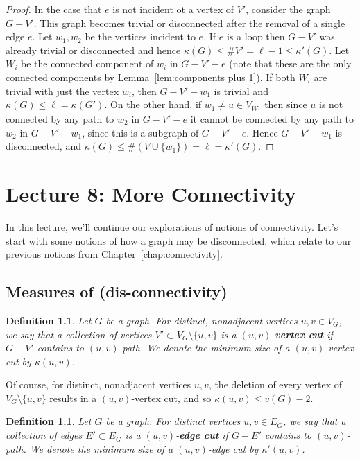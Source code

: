 \documentclass[12pt]{report}
\theoremstyle{plain}
\newtheorem{defn}[thm]{Definition}
\newcommand{\Xb}[1]{\textbf{#1}\index{#1}}
\begin{document}
\begin{proof}
In the case that $e$ is not incident ot a vertex of $V'$, consider the
graph $G - V'$. This graph becomes trivial or disconnected after the
removal of a single edge $e$. Let $w_1, w_2$ be the vertices incident to $e$.
If $e$ is a loop then $G - V'$ was already trivial or disconnected and
hence $\kappa(G) \leq \#V' = \ell - 1 \leq \kappa'(G)$. Let $W_i$ be the
connected component of $w_i$ in $G - V' - e$ (note that these are the only
connected components by Lemma~\ref{lem:components plus 1}). If both $W_i$
are trivial with just the vertex $w_i$, then $G - V' - w_1$ is trivial
and $\kappa(G) \leq \ell = \kappa(G')$. On the other hand, if $w_1 \neq u
\in V_{W_1}$ then since $u$ is not connected by any path to $w_2$ in $G -
V' - e$ it cannot be connected by any path to $w_2$ in $G - V' - w_1$,
since this is a subgraph of $G - V' - e$. Hence $G - V' - w_1$ is
disconnected, and $\kappa(G) \leq \#(V \cup \{w_1\}) = \ell = \kappa'(G)$.
\end{proof}

\chapter{Lecture 8: More Connectivity} \label{chap:more connectivity}

In this lecture, we'll continue our explorations of notions of
connectivity. Let's start with some notions of how a graph may be
disconnected, which relate to our previous notions from
Chapter~\ref{chap:connectivity}.

\section{Measures of (dis-connectivity)}

\begin{defn}
Let $G$ be a graph. For distinct, nonadjacent vertices $u, v \in V_G$, we
say that a collection of vertices $V' \subset V_G \setminus \{u, v\}$ is a
$(u,v)$-\Xb{vertex cut} if $G - V'$ contains to $(u, v)$-path. We denote
the minimum size of a $(u,v)$-vertex cut by $\kappa(u, v)$.
\end{defn}

Of course, for distinct, nonadjacent vertices $u, v$, the deletion of every
vertex of $V_G \setminus \{u, v\}$ results in a $(u, v)$-vertex cut, and so
$\kappa(u, v) \leq v(G) - 2$. 

\begin{defn}
Let $G$ be a graph. For distinct vertices $u, v \in E_G$, we say that a
collection of edges $E' \subset E_G$ is a $(u,v)$-\Xb{edge cut} if $G - E'$
contains to $(u, v)$-path. We denote the minimum size of a $(u,v)$-edge cut
by $\kappa'(u, v)$.
\end{defn}
\end{document}
